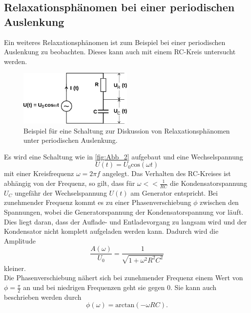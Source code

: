 \subsection{Relaxationsphänomen bei einer periodischen Auslenkung} %
\label{sub:Rela_peri}
Ein weiteres Relaxationsphänomen ist zum Beispiel bei einer periodischen Auslenkung zu beobachten. Dieses kann auch mit einem RC-Kreis untersucht werden.
\begin{figure}[H]
    \centering
    \includegraphics[width=0.5\textwidth]{build/Abb_2.pdf}
    \caption {Beispiel für eine Schaltung zur Diskussion von Relaxationsphänomen unter periodischen Auslenkung.\cite{v353}}
    \label{fig:Abb_2}
\end{figure}
\noindent Es wird eine Schaltung wie in \autoref{fig:Abb_2} aufgebaut und eine Wechselspannung
\begin{equation}
    U(t) = U_0 \text{cos}(\omega t)
    \label{eqn:Wechselspannung}
\end{equation}
mit einer Kreisfrequenz $\omega=2\pi f$ angelegt.
Das Verhalten des RC-Kreises ist abhängig von der Frequenz, so gilt, dass für $\omega << \frac{1}{RC}$ die Kondensatorspannung $U_C$ ungefähr der Wechselspannung $U(t)$ am Generator entspricht.
Bei zunehmender Frequenz kommt es zu einer Phasenverschiebung $\phi$ zwischen den Spannungen, wobei die Generatorspannung der Kondensatorspannung vor läuft.
Dies liegt daran, dass der Auflade- und Entladevorgang zu langsam wird und der Kondensator nicht komplett aufgeladen werden kann. 
Dadurch wird die Amplitude
\begin{equation}
    \frac{A(\omega)}{U_0} = \frac{1}{\sqrt{1+\omega^2R^2C^2}}
    \label{eqn:Amplitude}
\end{equation}
kleiner.\\
\noindent Die Phasenverschiebung nähert sich bei zunehmender Frequenz einem Wert von $\phi =\frac{\pi}{2}$ an und bei niedrigen Frequenzen geht sie gegen $0$.
Sie kann auch beschrieben werden durch
\begin{equation}
    \phi(\omega) = \text{arctan}(-\omega RC).
    \label{eqn:arctan}
\end{equation}


